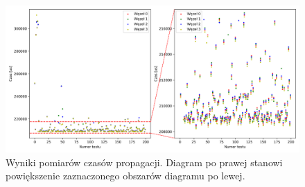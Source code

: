 \begin{figure}[H]
    \centering
    \includegraphics[width=\textwidth]{pics/ntp_sync/prop_times.png}
    \caption{Wyniki pomiarów czasów propagacji.  Diagram po prawej stanowi powiększenie zaznaczonego obszarów diagramu po lewej.}
    \label{pic:prop_times}
\end{figure}

